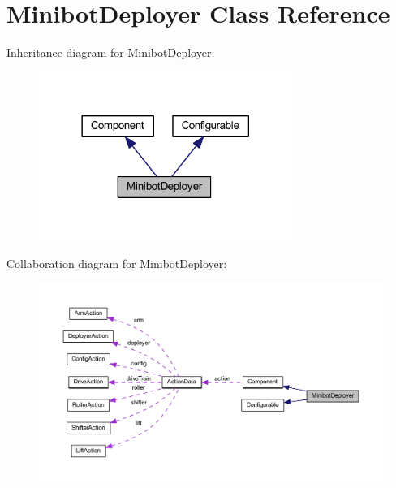 \hypertarget{class_minibot_deployer}{
\section{\-Minibot\-Deployer \-Class \-Reference}
\label{class_minibot_deployer}
}


\-Inheritance diagram for \-Minibot\-Deployer\-:\nopagebreak
\begin{figure}[H]
\begin{center}
\leavevmode
\includegraphics[width=234pt]{class_minibot_deployer__inherit__graph}
\end{center}
\end{figure}


\-Collaboration diagram for \-Minibot\-Deployer\-:\nopagebreak
\begin{figure}[H]
\begin{center}
\leavevmode
\includegraphics[width=350pt]{class_minibot_deployer__coll__graph}
\end{center}
\end{figure}
